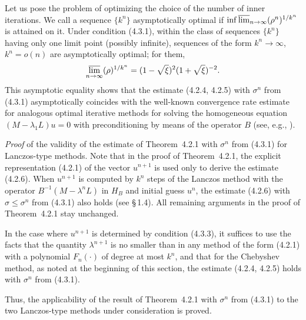 \documentclass[11pt,oneside]{book}
\begin{document}
Let us pose the problem of optimizing the choice of the number of inner iterations. We call a sequence $\{k^n\}$ asymptotically optimal if $\inf \varlimsup_{n \to \infty} (\rho^n)^{1/k^n}$ is attained on it. Under condition (4.3.1), within the class of sequences $\{k^n\}$ having only one limit point (possibly infinite), sequences of the form $k^n \to \infty$, $k^n = o(n)$ are asymptotically optimal; for them,
\[
\varlimsup_{n \to \infty} (\rho)^{1/k^n} = (1 - \sqrt{\xi})^2 (1 + \sqrt{\xi})^{-2}. %
\]
This asymptotic equality shows that the estimate (4.2.4, 4.2.5) with $\sigma^n$ from (4.3.1) asymptotically coincides with the well-known convergence rate estimate for analogous optimal iterative methods for solving
the homogeneous equation $(M - \lambda_1 L)u = 0$ with preconditioning by means of the operator $B$ (see, e.g., \citep{MarchukKuznetsov1975}).

\textit{Proof} of the validity of the estimate of Theorem~4.2.1 with $\sigma^n$ from (4.3.1) for Lanczos-type methods. Note that in the proof of Theorem~4.2.1, the explicit representation (4.2.1) of the vector $u^{n+1}$ is used only to derive the estimate (4.2.6). When $u^{n+1}$ is computed by $k^n$ steps of the Lanczos method with the operator $B^{-1}(M - \lambda^n L)$ in $H_B$ and initial guess $u^n$, the estimate (4.2.6) with $\sigma \leqslant \sigma^n$ from (4.3.1) also holds (see \S\,1.4). All remaining arguments in the proof of Theorem~4.2.1 stay unchanged.

In the case where $u^{n+1}$ is determined by condition (4.3.3), it suffices to use the facts that the quantity $\lambda^{n+1}$ is no smaller than in any method of the form (4.2.1) with a polynomial $F_n(\cdot)$ of degree at most $k^n$, and that for the Chebyshev method, as noted at the beginning of this section, the estimate (4.2.4, 4.2.5) holds with $\sigma^n$ from (4.3.1).

Thus, the applicability of the result of Theorem~4.2.1 with $\sigma^n$ from (4.3.1) to the two Lanczos-type methods under consideration is proved.
\end{document}

